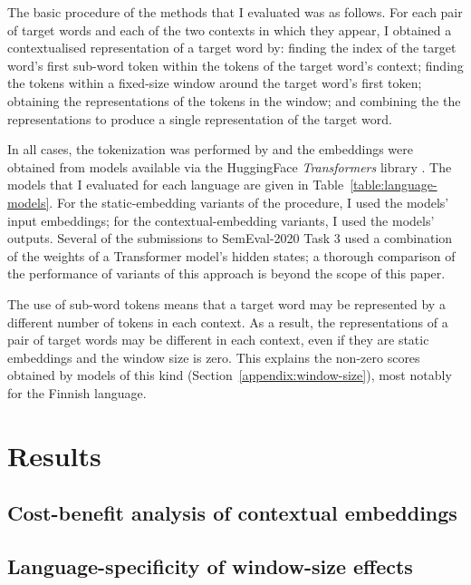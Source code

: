 The basic procedure of the methods that I evaluated was as follows.
For each pair of target words and each of the two contexts in which they appear, I
obtained a contextualised representation of a target word by:
finding the index of the target word's first sub-word token within the tokens of the target word's context;
finding the tokens within a fixed-size window around the target word's first token;
obtaining the representations of the tokens in the window; and
combining the the representations to produce a single representation of the target word.

In all cases, the tokenization was performed by and the embeddings were obtained from
models available via the HuggingFace \emph{Transformers} library \parencite{Wolf2020}.
The models that I evaluated for each language are given in Table~\ref{table:language-models}.
For the static-embedding variants of the procedure, I used the models' input embeddings;
for the contextual-embedding variants, I used the models' outputs.
Several of the submissions to SemEval-2020 Task 3 used a combination of the weights of a
Transformer model's hidden states; a thorough comparison of the performance of variants
of this approach is beyond the scope of this paper.

The use of sub-word tokens means that a target word may be represented by a
different number of tokens in each context.
As a result, the representations of a pair of target words may be different in each
context, even if they are static embeddings and the window size is zero.
This explains the non-zero scores obtained by models of this kind
(Section~\ref{appendix:window-size}), most notably for the Finnish language.

\section{Results}

\subsection{Cost-benefit analysis of contextual embeddings}

\subsection{Language-specificity of window-size effects}

